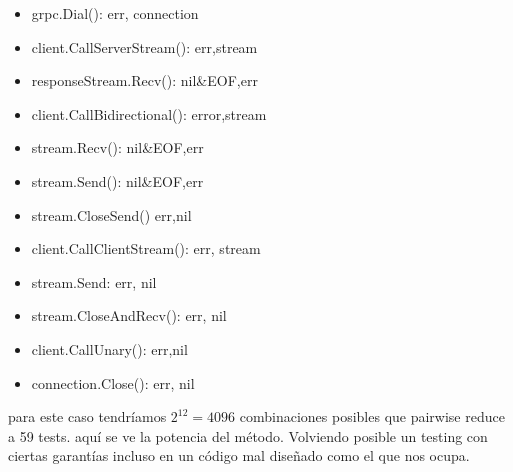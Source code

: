 \begin{itemize}
    \item grpc.Dial(): err, connection
    \item client.CallServerStream(): err,stream
    \item responseStream.Recv(): nil\&EOF,err
    \item client.CallBidirectional(): error,stream
    \item stream.Recv(): nil\&EOF,err
    \item stream.Send(): nil\&EOF,err
    \item stream.CloseSend() err,nil
    \item client.CallClientStream(): err, stream
    \item stream.Send: err, nil
    \item stream.CloseAndRecv(): err, nil
    \item client.CallUnary(): err,nil
    \item connection.Close(): err, nil
\end{itemize}

para este caso tendríamos $ 2^{12} = 4096 $ combinaciones posibles que pairwise reduce a 59 tests.
aquí se ve la potencia del método.
Volviendo posible un testing con ciertas garantías incluso en un código mal diseñado como el que nos ocupa.
